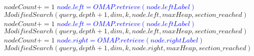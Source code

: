 \documentclass{article}
\begin{document}
\begin{algorithm}
\begin{algorithmic}
                    \State $nodeCount += 1$
                    \textcolor{blue}{\State $node.left = OMAP.retrieve(node.leftLabel)$}
                    \State $ModifiedSearch(query, depth+1, dim, k, node.left, maxHeap, section\_reached)$
                    \State $nodeCount += 1$
                    \textcolor{blue}{\State $node.left = OMAP.retrieve(node.leftLabel)$}
                    \State $ModifiedSearch(query, depth+1, dim, k, node.left, maxHeap, section\_reached)$
                    \State $nodeCount += 1$
                    \textcolor{blue}{\State $node.right = OMAP.retrieve(node.rightLabel)$}
                    \State $ModifiedSearch(query, depth+1, dim, k, node.right, maxHeap, section\_reached)$
                \EndIf
            \EndIf
        \EndIf
        
    \end{algorithmic}
\end{algorithm}
\end{document}
